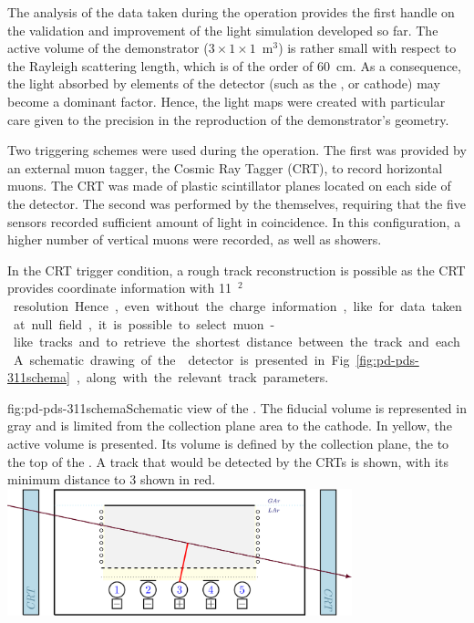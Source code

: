
The analysis of the data taken during the  operation provides the first handle on the validation and improvement of the light simulation developed so far. 
The active volume of the demonstrator ($3\times1\times1$~m$^3$) is rather small with respect to the Rayleigh scattering length, which is of the order of \SI{60}{\cm}. 
As a consequence, the light absorbed by elements of the detector (such as the ,  or cathode) may become a dominant factor.
Hence, the light maps were created with particular care given to the precision in the reproduction of the demonstrator's geometry.

Two triggering schemes were used during the  operation.
The first was provided by an external muon tagger, the Cosmic Ray Tagger (CRT), to record horizontal muons. The CRT was made of plastic scintillator planes located on each side of the detector.
The second was performed by the  themselves, requiring that the five sensors recorded sufficient amount of light in coincidence. In this configuration, a higher number of vertical muons were recorded, as well as showers.

In the CRT trigger condition, a rough track reconstruction is possible as the CRT provides coordinate information with \SI{11}{\cm$^2$} resolution. Hence, even without the charge information, like for data taken at null field, it is possible to select muon-like tracks and to retrieve the shortest distance between the track and each . A schematic drawing of the  detector is presented in Fig.~\ref{fig:pd-pds-311schema}, along with the relevant track parameters.

\begin{dunefigure}{fig:pd-pds-311schema}{Schematic view of the . 
The fiducial volume is represented in gray and is limited from the collection plane area to the cathode. In yellow, the active volume is presented. Its volume is defined by the collection plane, the  to the top of the . A track that would be detected by the CRTs is shown, with its minimum distance to  \num{3} shown in red.}
\includegraphics[width=0.75\textwidth]{graphics/dppd_7_2_v2}
\end{dunefigure}

